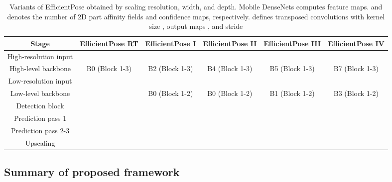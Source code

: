 \begin{table*}
\centering
\caption{Variants of EfficientPose obtained by scaling resolution, width, and depth. Mobile DenseNets  computes  feature maps.  and  denotes the number of 2D part affinity fields and confidence maps, respectively.  defines transposed convolutions with kernel size , output maps , and stride }
\label{tab:variants}       
\begin{tabular}{|c|c|c|c|c|c|}
\hline
\textbf{Stage}        & \textbf{EfficientPose RT}   & \textbf{EfficientPose I}    & \textbf{EfficientPose II}    & \textbf{EfficientPose III}   & \textbf{EfficientPose IV}    \\ \hline
High-resolution input &                    &                    &                     &                     &                     \\ \hline
High-level backbone   & B0 (Block 1-3) & B2 (Block 1-3) & B4 (Block 1-3)  & B5 (Block 1-3)  & B7 (Block 1-3)  \\ \hline
Low-resolution input  &                            &                    &                     &                     &                     \\ \hline
Low-level backbone    &                            & B0 (Block 1-2) & B0 (Block 1-2)  & B1 (Block 1-2)  & B3 (Block 1-2)  \\ \hline
Detection block       &         &         &  &  &  \\ \hline
Prediction pass 1     & \multicolumn{5}{c|}{}                                                                                                                 \\ \hline
Prediction pass 2-3   & \multicolumn{5}{c|}{}                                                                                                                  \\ \hline
Upscaling             & \multicolumn{5}{c|}{}                                                                                                         \\ \hline
\end{tabular}
\end{table*}

\subsection{Summary of proposed framework}
\label{sec:summary}

